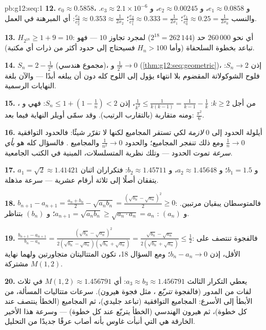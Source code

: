 \begin{solution}{pb:g12:seq:1}
\textbf{12.} $e_0 \approx 0.5858$، و $e_1 \approx 0.0858$،
و $e_2 \approx 0.00245$، و $e_3 \approx 2.1 \times 10^{-6}$.
والنسب $\frac{e_1}{e_0^2} \approx 0.25 = \frac{1}{2x_0}$؛
$\frac{e_2}{e_1^2} \approx 0.333 = \frac{1}{2x_1}$؛
$\frac{e_3}{e_2^2} \approx 0.353 \approx \frac{1}{2x_2}$: أي المبرهنة
في العمل.

\textbf{13.} $H_{2^{18}} \geq 1 + 9 = 10$: أي نحو
$260\,000$ حد ($2^{18} = 262\,144$) لمجرد تجاوز $10$ ---
فهو تباعد بخطوة السلحفاة (وأما $H_n > 100$ فسيحتاج إلى حدود
أكثر من ذرات أي مكتبة).

\textbf{14.} $S_n = 2 - \frac{1}{2^n}$ (مجموع هندسي)، و
$\frac{1}{2^n} \to 0$ (\cref{thm:g12:seq:geometric})، إذن
$S_n \to 2$: فلوح الشوكولاتة المقضوم بلا انتهاء يؤول إلى
اللوح كله دون أن يبلغه أبدًا --- والآن بلغة النهايات
الرسمية.

\textbf{15.} من أجل $k \geq 2$:
$\frac{1}{k^2} \leq \frac{1}{k(k-1)} = \frac{1}{k-1} -
\frac1k$، إذن
$S_n \leq 1 + \left(1 - \frac1n\right) < 2$: فهي  و
، ومنه متقاربة (بالتقارب الرتيب). وقد سمّى أويلر
النهاية فيما بعد: $\frac{\pi^2}{6}$.

\textbf{16.} أيلولة الحدود إلى $0$ \emph{لازمة} لكي
تستقر المجاميع لكنها لا تقرّر شيئًا: فالحدود التوافقية
$\frac1n \to 0$ ومع ذلك تنفجر المجاميع؛ والحدود
$\frac{1}{n^2} \to 0$ والمجاميع . فالسؤال كله هو
\emph{بأي سرعة} تموت الحدود --- وتلك نظرية المتسلسلات،
المبنية في الكتب الجامعية.

\textbf{17.} $a_1 = \sqrt2 \approx 1.41421$ و $b_1 = 1.5$؛
و $a_2 \approx 1.45648$، و $b_2 \approx 1.45711$: فتكراران
اثنان يتفقان أصلًا إلى ثلاثة أرقام عشرية --- سرعة مذهلة.

\textbf{18.} $b_{n+1} - a_{n+1} = \frac{a_n + b_n}{2} -
\sqrt{a_n b_n} = \frac{(\sqrt{b_n} - \sqrt{a_n})^2}{2} \geq
0$: فالمتوسطان يبقيان مرتبين. و $(a_n)$ :
$a_{n+1} = \sqrt{a_n b_n} \geq \sqrt{a_n \cdot a_n} = a_n$؛
و $(b_n)$  بتناظر.

\textbf{19.} $\frac{b_{n+1} - a_{n+1}}{b_n - a_n} =
\frac{(\sqrt{b_n} - \sqrt{a_n})^2}
{2(\sqrt{b_n} - \sqrt{a_n})(\sqrt{b_n} + \sqrt{a_n})}
= \frac{\sqrt{b_n} - \sqrt{a_n}}{2(\sqrt{b_n} + \sqrt{a_n})}
\leq \frac12$: فالفجوة تنتصف على الأقل، إذن $b_n - a_n \to 0$؛
ومع السؤال 18، تكون المتتاليتان متجاورتين ولهما نهاية مشتركة
$M(1, 2)$.

\textbf{20.} يعطي التكرار الثالث
$a_3 \approx b_3 \approx 1.456791$: أي $M(1, 2) \approx
1.456791$ في ثلاث لفات من المدور (فالفجوة
\emph{تتربّع} ، مثل فجوة هيرون).  سرعات
متتاليات المسألة، من الأبطأ إلى الأسرع: المجاميع التوافقية (تباعد
جليدي)، ثم المجاميع  (الخطأ ينتصف عند كل خطوة)،
ثم هيرون  الهندسي (الخطأ يتربّع عند كل خطوة) --- وسرعة
هذا الأخير الخارقة هي التي أنبأت غاوس بأنه أصاب عرقًا جديدًا
من التحليل.
\end{solution}
